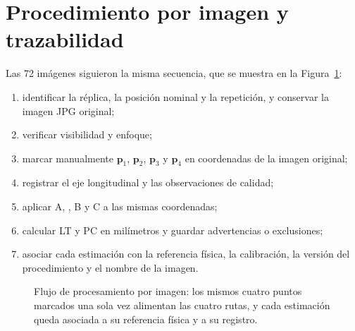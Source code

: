\section{Procedimiento por imagen y trazabilidad}
\label{sec:procedimiento}

Las 72 imágenes siguieron la misma secuencia, que se muestra en la Figura~\ref{fig:3-flujo}:

\begin{enumerate}
  \item identificar la réplica, la posición nominal y la repetición, y conservar la imagen JPG original;
  \item verificar visibilidad y enfoque;
  \item marcar manualmente $\mathbf{p}_1$, $\mathbf{p}_2$, $\mathbf{p}_3$ y $\mathbf{p}_4$ en coordenadas de la imagen original;
  \item registrar el eje longitudinal y las observaciones de calidad;
  \item aplicar A, \Aprime, B y C a las mismas coordenadas;
  \item calcular LT y PC en milímetros y guardar advertencias o exclusiones;
  \item asociar cada estimación con la referencia física, la calibración, la versión del procedimiento y el nombre de la imagen.
\end{enumerate}

\begin{figure}[H]
\centering
\caption[Flujo de procesamiento por imagen]{Flujo de procesamiento por imagen: los mismos cuatro puntos marcados una sola vez alimentan las cuatro rutas, y cada estimación queda asociada a su referencia física y a su registro.}
\label{fig:3-flujo}
\end{figure}

